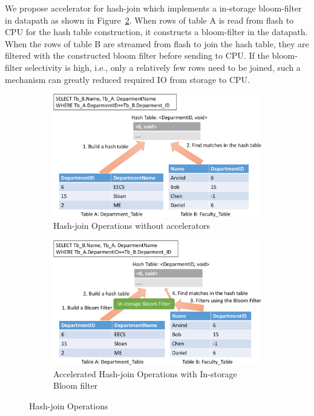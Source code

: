 \documentclass{article}
\begin{document}
We propose accelerator for hash-join which implements a in-storage bloom-filter in datapath as shown in Figure~\ref{fig:filter-hash-join}.
When rows of table A is read from flash to CPU for the hash table construction, it constructs a bloom-filter in the datapath.
When the rows of table B are streamed from flash to join the hash table, they are filtered with the constructed bloom filter before sending to CPU.
If the bloom-filter selectivity is high, i.e., only a relatively few rows need to be joined, such a mechanism can greatly reduced required IO from storage to CPU.

\begin{figure}[!htb]
  \centering
  \begin{subfigure}[t]{0.48\textwidth}
    \includegraphics[width=\textwidth]{figures/hash-join-crop.pdf}
      \caption{Hash-join Operations without accelerators}
      \label{fig:hash-join}
  \end{subfigure}
  \begin{subfigure}[t]{0.48\textwidth}
    \includegraphics[width=\textwidth]{figures/filter-hash-join-crop.pdf}
    \caption{Accelerated Hash-join Operations with In-storage Bloom filter}
    \label{fig:filter-hash-join}
  \end{subfigure}
  \label{fig:try}
  \caption{Hash-join Operations}
\end{figure}
\end{document}
